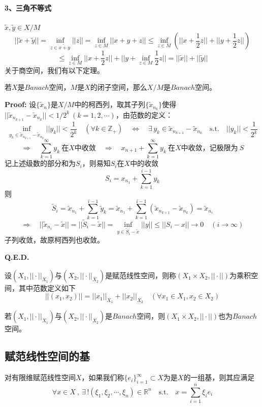 \paragraph*{3、三角不等式} \quad $\tilde{x},\tilde{y} \in X/M$
\[||\tilde{x}+\tilde{y}||=\mathop \text{inf}\limits_{z \in \tilde{x+y}}||z||=\mathop \text{inf}\limits_{z \in M}||x+y+z|| \leq \mathop \text{inf}\limits_{z \in M}\left(||x+\frac{1}{2}z||+||y+\frac{1}{2}z||\right)\]
\[\leq \mathop \text{inf}\limits_{z \in M}||x+\frac{1}{2}z||+||y+\mathop \text{inf}\limits_{z \in M}\frac{1}{2}z||=||\tilde{x}||+||\tilde{y}||\]
关于商空间，我们有以下定理。
\begin{theorem}
    若$X$是$Banach$空间，$M$是$X$的闭子空间，那么$X/M$是$Banach$空间。
\end{theorem}
\textbf{Proof:} 设$\{\tilde{x}_n\}$是$X/M$中的柯西列，取其子列$\{\tilde{x}_{n_k}\}$使得$||\tilde{x}_{n_{k+1}}-\tilde{x}_{n_k}||<1/2^k \ (k=1,2,\cdots)$，由范数的定义：
\[\mathop \text{inf}\limits_{y_k \in \tilde{x}_{n_{k+1}}-\tilde{x}_{n_k}}||y_k||<\frac{1}{2^k} \quad (\forall k \in \mathbb{Z}_+) \quad \Leftrightarrow \quad \exists \, y_k \in \tilde{x}_{n_{k+1}}-\tilde{x}_{n_k} \quad \text{s.t.} \quad ||y_k||<\frac{1}{2^k}\]
\[\Rightarrow \quad \sum_{k=1}^{\infty}y_k \ \text{在$X$中收敛} \quad \Rightarrow \quad x_{n+1}+\sum_{k=1}^{\infty}y_k \ \text{在$X$中收敛，记极限为} \ S\]
记上述级数的部分和为$S_i$，则易知$S_i$在$X$中的收敛
\[S_i=x_{n_1}+\sum_{k=1}^{i-1}y_k\]
则
\[\tilde{S}_i=\tilde{x}_{n_1}+\sum_{k=1}^{i-1}\tilde{y}_k=\tilde{x}_{n_1}+\sum_{k=1}^{i-1}\left(\tilde{x}_{n_{k+1}}-\tilde{x}_{n_k}\right)=\tilde{x}_{n_i}\]
\[\Rightarrow \quad ||\tilde{x}_{n_i}-\tilde{x}||=||\tilde{S}_i-\tilde{x}||=\mathop \text{inf}\limits_{y \in \tilde{S}_i-\tilde{x}}||y|| \leq ||S_i-x||\rightarrow 0 \quad (i \rightarrow \infty)\]
子列收敛，故原柯西列也收敛。

\textbf{Q.E.D.}
\begin{definition}[乘积空间]
    设$(X_1,||\cdot||_{X_1})$与$(X_2,||\cdot||_{X_2})$是赋范线性空间，则称$(X_1 \times X_2,||\cdot||)$为乘积空间，其中范数定义如下
    \[||(x_1,x_2)||=||x_1||_{X_1}+||x_2||_{X_2} \quad (\forall x_1 \in X_1,x_2 \in X_2)\]
\end{definition}
若$(X_1,||\cdot||_{X_1})$与$(X_2,||\cdot||_{X_2})$是$Banach$空间，则$(X_1 \times X_2,||\cdot||)$也为$Banach$空间。

\subsection{赋范线性空间的基} \label{baseset}
对有限维赋范线性空间$X$，如果我们称$\{e_i\}_{i=1}^{\infty} \subset X$为是$X$的一组基，则其应满足
\[\forall x \in X \ , \ \exists \, ! (\xi_1,\xi_2,\cdots,\xi_n) \in \mathbb{R}^n \quad \text{s.t.} \quad x=\sum_{i=1}^n\xi_ie_i\]

